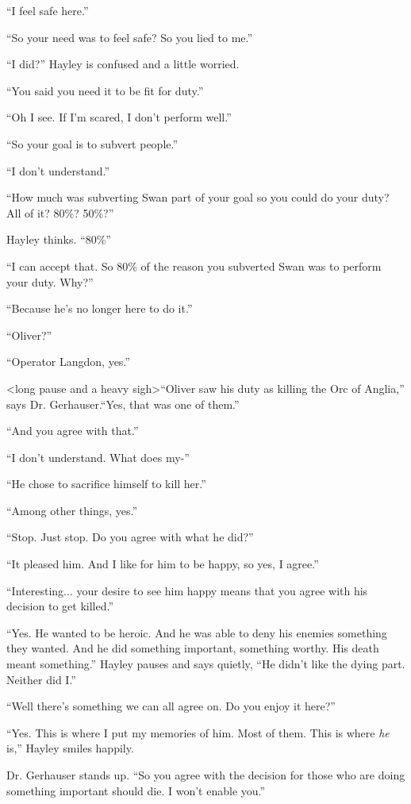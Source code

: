 ``I feel safe here.''

``So your need was to feel safe?  So you lied to me.''

``I did?'' Hayley is confused and a little worried.

``You said you need it to be fit for duty.''

``Oh I see.  If I'm scared, I don't perform well.''

``So your goal is to subvert people.''

``I don't understand.''

``How much was subverting Swan part of your goal so you could do your duty?  All of it?  80\%? 50\%?''

Hayley thinks.  ``80\%''

``I can accept that.  So 80\% of the reason you subverted Swan was to perform your duty.  Why?''

``Because he's no longer here to do it.''

``Oliver?''

``Operator Langdon, yes.''

\textless long pause and a heavy sigh\textgreater  ``Oliver saw his duty as killing the Orc of Anglia,'' says Dr. Gerhauser.``Yes, that was one of them.''

``And you agree with that.''

``I don't understand.  What does my-''

``He chose to sacrifice himself to kill her.''

``Among other things, yes.''

``Stop.  Just stop.  Do you agree with what he did?''

``It pleased him.  And I like for him to be happy, so yes, I agree.''

``Interesting... your desire to see him happy means that you agree with his decision to get killed.''

``Yes.  He wanted to be heroic.  And he was able to deny his enemies something they wanted.  And he did something important, something worthy.  His death meant something.''  Hayley pauses and says quietly, ``He didn't like the dying part.  Neither did I.''

``Well there's something we can all agree on.  Do you enjoy it here?''

``Yes.  This is where I put my memories of him.  Most of them.  This is where \textit{he} is,'' Hayley smiles happily.

Dr. Gerhauser stands up.  ``So you agree with the decision for those who are doing something important should die.  I won't enable you.''

